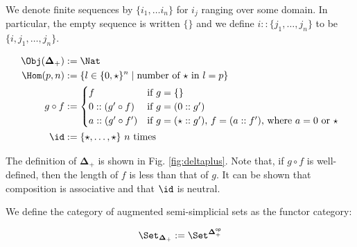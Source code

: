 \documentclass[10pt]{art.cls/art}
\newcommand{\DeltaPlus}{\ensuremath{\boldsymbol{\Delta}_+}}
\newcommand{\kstar}{{\star}}
\begin{document}
\begin{notation}
  We denote finite sequences by $\{i_1, \ldots i_n\}$ for $i_j$ ranging over some domain. In particular, the empty sequence is written $\{\}$ and we define $i :: \{j_1, \ldots, j_n\}$ to be $\{i, j_1, \ldots, j_n\}$.
\end{notation}

\begin{definition}[$\DeltaPlus$]
  \begin{figure*}[!t]
    \begin{align*}
      \Obj(\DeltaPlus) & := \Nat                                                                     \\
      \Hom(p, n)       & := \{l \in \{0, \kstar\}^n \mid \text{number of $\kstar$ in $l = p$}\}      \\
      g \circ f        & :=
      \begin{cases}
        f                  & \text{if $g = \{\}$}                                                      \\
        0 :: (g' \circ f)  & \text{if $g = (0 :: g')$}                                                 \\
        a :: (g' \circ f') & \text{if $g = (\star :: g')$, $f = (a :: f')$, where $a = 0$ or $\kstar$} \\
      \end{cases} \\
      \id              & := \{\kstar, \ldots, \kstar\} \text{ $n$ times} %
    \end{align*}
    \caption{Definition of \DeltaPlus}\label{fig:deltaplus}
  \end{figure*}

  The definition of $\DeltaPlus$ is shown in Fig. \ref{fig:deltaplus}. Note that, if $g \circ f$ is well-defined, then the length of $f$ is less than that of $g$. It can be shown that composition is associative and that $\id$ is neutral.
\end{definition}

\begin{definition}[$\Set_{\DeltaPlus}$]
  We define the category of augmented semi-simplicial sets as the functor category:

  \begin{equation*}
    \Set_{\DeltaPlus} := \Set^{\DeltaPlus^{\mathsf{op}}}
  \end{equation*}
\end{definition}
\end{document}
